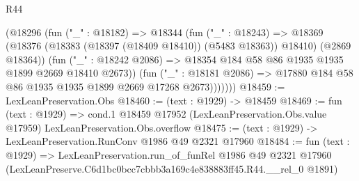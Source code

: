 \begin{lexlean}{R44}
\begin{coremodule}
              (@18296
                (fun ("_" : @18182) =>
                @18344
                  (fun ("_" : @18243) =>
                  @18369
                    (@18376 (@18383 (@18397 (@18409 @18410)) (@5483 @18363)) @18410)
                    (@2869 @18364))
                  (fun ("_" : @18242 @2086) =>
                  @18354 @184 @58 @86 @1935 @1935 @1899 @2669 @18410 @2673))
                (fun ("_" : @18181 @2086) =>
                @17880 @184 @58 @86 @1935 @1935 @1899 @2669 @17268 @2673)))))))
@18459 := LexLeanPreservation.Obs
@18460 := (text : @1929) -> @18459
@18469 := fun (text : @1929) =>
  cond.{1} @18459 @17952 (LexLeanPreservation.Obs.value @17959) LexLeanPreservation.Obs.overflow
@18475 := (text : @1929) -> LexLeanPreservation.RunConv @1986 @49 @2321 @17960
@18484 := fun (text : @1929) =>
  LexLeanPreservation.run_of_funRel
    @1986
    @49
    @2321
    @17960
    (LexLeanPreserve.C6d1bc0bcc7cbbb3a169c4e838883ff45.R44.__rel_0 @1891)
\end{coremodule}
\end{lexlean}

